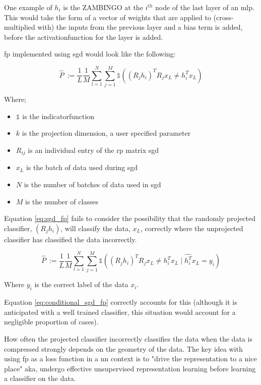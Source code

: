 One example of $h_i$ is the ZAMBINGO at the $i^{th}$ node of the last layer of an \gls{mlp}. This would take the form of a vector of weights that are applied to (cross-multiplied with) the inputs from the previous layer and a bias term is added, before the \gls{activationfunction} for the layer is added.
\bigskip

\bigskip

 \gls{fp} implemented using  \gls{sgd} would look like the following:

\begin{equation}[H]
\label{eq:sgd_fp}
\hat{P}\ := \frac{1}{L}\frac{1}{M}\sum_{l = 1}^N \sum_{j = 1}^M \mathds{1}((R_j h_i)^T R_jx_L \neq h_i^Tx_L)  
\end{equation}

Where;  \smallskip

\begin{itemize}
\item $\mathds{1}$ is the \gls{indicatorfunction}  
\item $k$ is the projection dimension, a user specified parameter 
\item $R_{ij}$ is an individual entry of the \gls{rp} matrix  \gls{sgd} 
\item $x_L$ is the batch of data used during  \gls{sgd}  
\item $N$ is the number of batches of data used in  \gls{sgd}  
\item $M$ is the number of classes %
\end{itemize}

Equation \ref{eq:sgd_fp} fails to consider the possibility that the randomly projected classifier,  $(R_j h_i)$, will classify the data, $x_L$, correctly where the unprojected classifier has classified the data incorrectly.
\bigskip

\begin{equation}
\label{eq:conditional_sgd_fp}
\hat{P}\ := \frac{1}{L}\frac{1}{M}\sum_{l = 1}^N \sum_{j = 1}^M  \mathds{1}( (R_j h_i)^T R_jx_L \neq h_i^Tx_L \mid \hat{h_i^T}x_L = y_i )  
\end{equation}

Where $y_i$ is the correct label of the data $x_i$. 
\bigskip

Equation \ref{eq:conditional_sgd_fp} correctly accounts for this (although it is anticipated with a well trained classifier, this situation would account for a negligible proportion of cases). 
\bigskip

How often the projected classifier incorrectly classifies the data when the data is compressed strongly depends on the  geometry of the data. The key idea with using  \gls{fp} as a loss function in a  \gls{nn} context is to "drive the representation to a nice place" aka, undergo effective unsupervised representation learning before learning a classifier on the data. 
\bigskip

